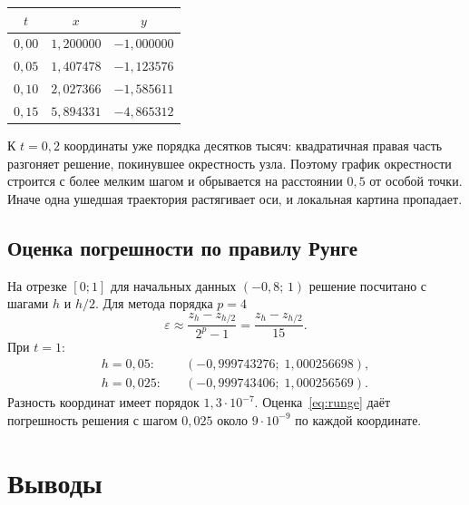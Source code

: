 \documentclass[12pt,a4paper]{article}
\begin{document}
\begin{center}
\begin{tabular}{ccc}
\toprule
\(t\) & \(x\) & \(y\) \\
\midrule
\(0{,}00\) & \(1{,}200000\) & \(-1{,}000000\) \\
\(0{,}05\) & \(1{,}407478\) & \(-1{,}123576\) \\
\(0{,}10\) & \(2{,}027366\) & \(-1{,}585611\) \\
\(0{,}15\) & \(5{,}894331\) & \(-4{,}865312\) \\
\bottomrule
\end{tabular}
\end{center}

К \(t = 0{,}2\) координаты уже порядка десятков тысяч: квадратичная правая часть разгоняет решение, покинувшее окрестность узла. Поэтому график окрестности строится с более мелким шагом и обрывается на расстоянии \(0{,}5\) от особой точки. Иначе одна ушедшая траектория растягивает оси, и локальная картина пропадает.

\subsection{Оценка погрешности по правилу Рунге}

На отрезке \([0;1]\) для начальных данных \((-0{,}8;\,1)\) решение посчитано с шагами \(h\) и \(h/2\). Для метода порядка \(p = 4\)
\begin{equation}
\label{eq:runge}
\varepsilon \approx \frac{z_h - z_{h/2}}{2^{p}-1} = \frac{z_h - z_{h/2}}{15}.
\end{equation}
При \(t = 1\):
\begin{align*}
h = 0{,}05:&\quad (-0{,}999743276;\; 1{,}000256698),\\
h = 0{,}025:&\quad (-0{,}999743406;\; 1{,}000256569).
\end{align*}
Разность координат имеет порядок \(1{,}3\cdot 10^{-7}\). Оценка~\eqref{eq:runge} даёт погрешность решения с шагом \(0{,}025\) около \(9\cdot 10^{-9}\) по каждой координате.

\section{Выводы}
\end{document}
